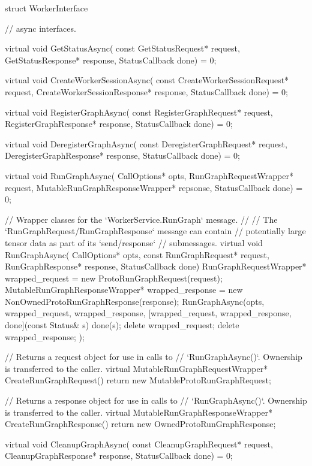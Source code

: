 \begin{content}
\begin{content}
\begin{content}
\begin{leftbar}
\begin{c++}
struct WorkerInterface {
  // async interfaces.

  virtual void GetStatusAsync(
      const GetStatusRequest* request,
      GetStatusResponse* response,
      StatusCallback done) = 0;

  virtual void CreateWorkerSessionAsync(
      const CreateWorkerSessionRequest* request,
      CreateWorkerSessionResponse* response, 
      StatusCallback done) = 0;

  virtual void RegisterGraphAsync(
      const RegisterGraphRequest* request,
      RegisterGraphResponse* response,
      StatusCallback done) = 0;

  virtual void DeregisterGraphAsync(
      const DeregisterGraphRequest* request,
      DeregisterGraphResponse* response,
      StatusCallback done) = 0;

  virtual void RunGraphAsync(
      CallOptions* opts, 
      RunGraphRequestWrapper* request,
      MutableRunGraphResponseWrapper* repsonse,
      StatusCallback done) = 0;

  // Wrapper classes for the `WorkerService.RunGraph` message.
  //
  // The `RunGraphRequest/RunGraphResponse` message can contain 
  // potentially large tensor data as part of its `send/response`
  // submessages.
  virtual void RunGraphAsync(
      CallOptions* opts, 
      const RunGraphRequest* request,
      RunGraphResponse* response, 
      StatusCallback done) {
    RunGraphRequestWrapper* wrapped_request = 
        new ProtoRunGraphRequest(request);
    MutableRunGraphResponseWrapper* wrapped_response =
        new NonOwnedProtoRunGraphResponse(response);
    RunGraphAsync(opts, wrapped_request, wrapped_response,
        [wrapped_request, wrapped_response, done](const Status& s) {
            done(s);
            delete wrapped_request;
            delete wrapped_response;
        });
  }

  // Returns a request object for use in calls to
  // `RunGraphAsync()`. Ownership is transferred to the caller.
  virtual MutableRunGraphRequestWrapper* CreateRunGraphRequest() {
    return new MutableProtoRunGraphRequest;
  }

  // Returns a response object for use in calls to
  // `RunGraphAsync()`. Ownership is transferred to the caller.
  virtual MutableRunGraphResponseWrapper* CreateRunGraphResponse() {
    return new OwnedProtoRunGraphResponse;
  }

  virtual void CleanupGraphAsync(
      const CleanupGraphRequest* request,
      CleanupGraphResponse* response,
      StatusCallback done) = 0;

}
\end{c++}
\end{leftbar}
\end{content}
\end{content}
\end{content}

